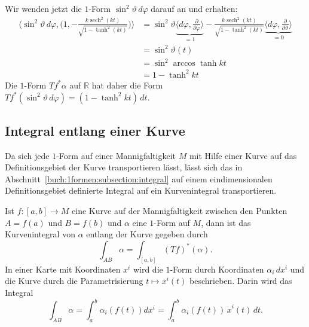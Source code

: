 \begin{beispiel}
Wir wenden jetzt die $1$-Form $\sin^2\vartheta\, d\varphi$ darauf
an und erhalten:
\begin{align*}
\biggl\langle
\sin^2\vartheta\,d\varphi,
\biggl(1,
-\frac{k\operatorname{sech}^2(kt)}{\sqrt{1-\tanh^2(kt)}}
\biggr)
\biggr\rangle
&=
\sin^2\vartheta
\underbrace{
\biggl\langle
d\varphi,\frac{\partial}{\partial \varphi}
\biggr\rangle
}_{\displaystyle = 1}
-
\frac{k\operatorname{sech}^2(kt)}{\sqrt{1-\tanh^2(kt)}}
\underbrace{
\biggl\langle
d\varphi,\frac{\partial}{\partial\vartheta}
\biggr\rangle
}_{\displaystyle = 0}
\\
&=
\sin^2\vartheta(t)
\\
&=
\sin^2 \arccos \tanh kt
\\
&=
1-\tanh^2 kt
\end{align*}
Die $1$-Form $Tf^*\alpha$ auf $\mathbb{R}$ hat daher die Form 
$Tf^*(\sin^2\vartheta\,d\varphi)=(1-\tanh^2 kt)\,dt$.
\end{beispiel}


%
%
\subsection{Integral entlang einer Kurve}
Da sich jede $1$-Form auf einer Mannigfaltigkeit $M$ mit Hilfe einer
Kurve auf das Definitionsgebiet der Kurve transportieren lässt, lässt
sich das in Abschnitt~\ref{buch:1formen:subsection:integral} auf einem
eindimensionalen Definitionsgebiet definierte Integral auf ein
Kurvenintegral transportieren.

\begin{definition}
Ist $f\colon [a,b]\to M$ eine Kurve auf der Mannigfaltigkeit zwischen 
den Punkten $A=f(a)$ und $B=f(b)$ und $\alpha$ eine $1$-Form auf $M$,
dann ist das Kurvenintegral von $\alpha$ entlang der Kurve gegeben
durch
\[
\int_{AB} \alpha
=
\int_{[a,b]}
(Tf)^*(\alpha).
\]
In einer Karte mit Koordinaten $x^i$ wird die $1$-Form durch Koordinaten
$\alpha_i\,dx^i$ und die Kurve durch die
Parametrisierung $t\mapsto x^i(t)$ beschrieben.
Darin wird das Integral
\[
\int_{AB} \alpha
=
\int_a^b \alpha_i(f(t)) dx^i
=
\int_a^b \alpha_i(f(t))\,\dot{x}^{i}(t)\,dt.
\]
\end{definition}

